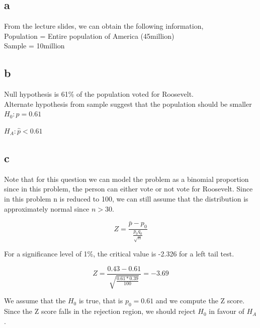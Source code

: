 \documentclass[12pt]{article}
\begin{document}
\subsection*{a}
From the lecture slides, we can obtain the following information,\\
Population = Entire population of America (45million)\\
Sample = 10million

\subsection*{b}

Null hypothesis is 61\% of the population voted for Roosevelt.\\
Alternate hypothesis from sample suggest that the population should be smaller\\

$H_0: p=0.61$

$H_{A}: \hat{p}<0.61$

\subsection*{c}

Note that for this question we can model the problem as a binomial proportion 
since in this problem, the person can either vote or not vote for
Roosevelt. Since in this problem n is reduced to 100, we can still assume that
the distribution is approximately normal since $n>30$.

\[
    Z = \frac{\bar{p} - p_0}{\frac{p_0 q_0}{\sqrt{n}}}
\]

For a significance level of 1\%, the critical value is -2.326 for a left tail
test.

\[
    Z = \frac{0.43 - 0.61}{\sqrt{\frac{0.61*0.39}{100}}} = -3.69
\]

We assume that the $H_0$ is true, that is $p_0=0.61$ and we compute the Z score.
Since the Z score falls in the rejection region, we should reject $H_0$ in favour
of $H_{A}$.
\end{document}
